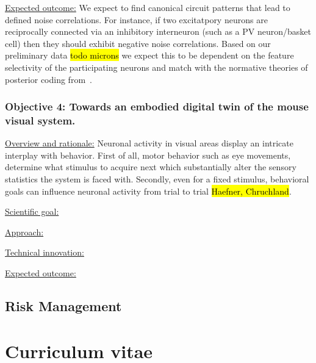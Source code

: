 \documentclass[COG,11pt]{ercgrant}
\begin{document}
\underline{Expected outcome:} We expect to find canonical circuit patterns that lead to defined noise correlations. For instance, if two excitatpory neurons are reciprocally connected via an inhibitory interneuron (such as a PV neuron/basket cell) then they should exhibit negative noise correlations. Based on our preliminary data \hl{todo microns} we expect this to be dependent on the feature selectivity of the participating neurons and match with the normative theories of posterior coding from~\objii.

\subsubsection{\colorbox{objiv}{Objective 4}: Towards an embodied digital twin of the mouse visual system.}
\label{sub:objiv}
\underline{Overview and rationale:} 
Neuronal activity in visual areas display an intricate interplay with behavior. First of all, motor behavior such as eye movements, determine what stimulus to acquire next which substantially alter the sensory statistics the system is faced with. Secondly, even for a fixed stimulus, behavioral goals can influence neuronal activity from trial to trial \hl{Haefner, Chruchland}. 

\underline{Scientific goal:} 

\underline{Approach:}

\underline{Technical innovation:} 

\underline{Expected outcome:} 

\subsection{Risk Management}


\begin{small}
\printbibliography
\end{small}

% 	
% 	

\newpage
\section{Curriculum vitae}
\end{document}
